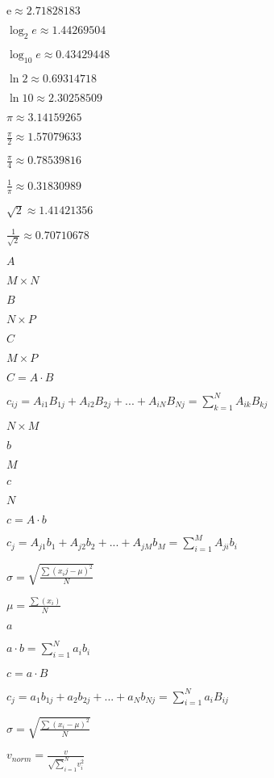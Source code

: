 \documentclass{article}
\begin{document}
$ \mathrm{e} \approx 2.71828183 $
\pagebreak

$ \log_2 e \approx 1.44269504 $
\pagebreak

$ \log_{10} e \approx 0.43429448 $
\pagebreak

$ \ln 2 \approx 0.69314718 $
\pagebreak

$ \ln 10 \approx 2.30258509 $
\pagebreak

$ \pi \approx 3.14159265 $
\pagebreak

$ \frac{\pi}{2} \approx 1.57079633 $
\pagebreak

$ \frac{\pi}{4} \approx 0.78539816 $
\pagebreak

$ \frac{1}{\pi} \approx 0.31830989 $
\pagebreak

$ \sqrt{2} \approx 1.41421356 $
\pagebreak

$ \frac{1}{\sqrt{2}} \approx 0.70710678 $
\pagebreak

$ A $
\pagebreak

$ M \times N $
\pagebreak

$ B $
\pagebreak

$ N \times P $
\pagebreak

$ C $
\pagebreak

$ M \times P $
\pagebreak

$ C = A \cdot B $
\pagebreak

$ c_{ij} = A_{i1} B_{1j} + A_{i2} B_{2j} + ... + A_{iN} B_{Nj} = \sum_{k=1}^{N} A_{ik} B_{kj} $
\pagebreak

$ N \times M $
\pagebreak

$ b $
\pagebreak

$ M $
\pagebreak

$ c $
\pagebreak

$ N $
\pagebreak

$ c = A \cdot b $
\pagebreak

$ c_{j} = A_{j1} b_1 + A_{j2} b_2 + ... + A_{jM} b_M = \sum_{i=1}^{M} A_{ji} b_i $
\pagebreak

$ \sigma = \sqrt{\frac{\sum(x_ij - \mu)^2}{N}} $
\pagebreak

$ \mu = \frac{\sum(x_i)}{N} $
\pagebreak

$ a $
\pagebreak

$ a \cdot b = \sum_{i=1}^{N} a_i b_i $
\pagebreak

$ c = a \cdot B $
\pagebreak

$ c_{j} = a_1 b_{1j} + a_2 b_{2j} + ... + a_N b_{Nj} = \sum_{i=1}^{N} a_i B_{ij} $
\pagebreak

$ \sigma = \sqrt{\frac{\sum(x_i - \mu)^2}{N}} $
\pagebreak

$ v_{norm} = \frac{v}{\sqrt \sum_{i=1}^{N} v_i^2} $
\pagebreak
\end{document}

